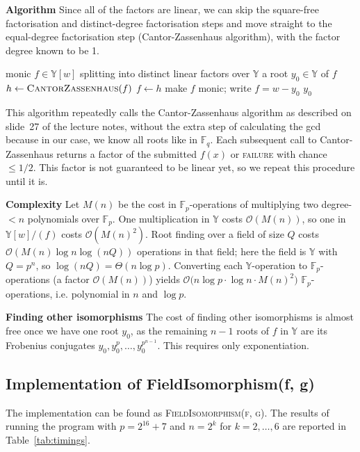 \documentclass{article}
\begin{document}
\textbf{Algorithm}
Since all of the factors are linear, we can skip the square-free factorisation and distinct-degree factorisation steps and move straight to the equal-degree factorisation step (Cantor-Zassenhaus algorithm), with the factor degree known to be 1.

\begin{algorithm}
\caption{\textsc{FindRoot}$(f)$ --- one root of $f$ in $\mathbb{Y}$}
\begin{algorithmic}[1]
\Require monic $f \in \mathbb{Y}[w]$ splitting into distinct linear factors over $\mathbb{Y}$
\Ensure a root $y_0 \in \mathbb{Y}$ of $f$
    \Repeat
        \State $h \gets \textsc{CantorZassenhaus}(f)$
    \State $f \gets h$ 
\EndWhile
\State make $f$ monic; write $f = w - y_0$
\State \Return $y_0$
\end{algorithmic}
\end{algorithm}

This algorithm repeatedly calls the Cantor-Zassenhaus algorithm as described on slide~27 of the lecture notes, without the extra step of calculating the gcd because in our case, we know all roots like in $\mathbb{F}_q$. Each subsequent call to Cantor-Zassenhaus returns a factor of the submitted $f(x)$ or \textsc{failure} with chance $\le 1/2$. This factor is not guaranteed to be linear yet, so we repeat this procedure until it is.

\textbf{Complexity}
Let $M(n)$ be the cost in $\mathbb{F}_p$-operations of multiplying two
degree-$<n$ polynomials over $\mathbb{F}_p$. One multiplication in $\mathbb{Y}$ costs $\mathcal{O}(M(n))$, so one in $\mathbb{Y}[w]/(f)$ costs $\mathcal{O}(M(n)^2)$. Root finding over a field of size $Q$ costs $\mathcal{O}(M(n)\log n\log(nQ))$ operations in that field; here the field is $\mathbb{Y}$ with $Q=p^n$, so $\log(nQ)=\Theta(n\log p)$. Converting each $\mathbb{Y}$-operation to $\mathbb{F}_p$-operations (a factor $\mathcal{O}(M(n))$) yields $\mathcal{O}\!\big(n\log p\cdot\log n\cdot M(n)^2\big)$ $\mathbb{F}_p$-operations, i.e. polynomial in $n$ and $\log p$.

\textbf{Finding other isomorphisms}
\label{sec:otheriso}
The cost of finding other isomorphisms is almost free once we have one root $y_0$, as the remaining $n-1$ roots of $f$ in $\mathbb{Y}$ are its Frobenius conjugates $y_0, y_0^p, \dots, y_0^{p^{n-1}}$. This requires only exponentiation.

\subsection{Implementation of FieldIsomorphism(f, g)}
The implementation can be found as \textsc{FieldIsomorphism(f, g)}. The results of running the program with $p=2^{16}+7$ and $n=2^k$ for $k=2, \dots, 6$ are reported in Table~\ref{tab:timings}. 
\end{document}
